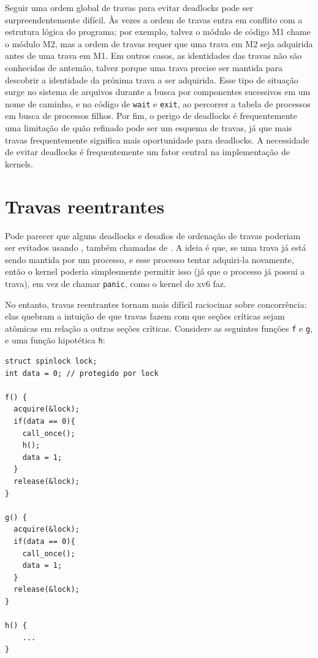 Seguir uma ordem global de travas para evitar deadlocks pode ser surpreendentemente
difícil. Às vezes a ordem de travas entra em conflito com a estrutura lógica do
programa; por exemplo, talvez o módulo de código M1 chame o módulo M2, mas a ordem
de travas requer que uma trava em M2 seja adquirida antes de uma trava em M1.
Em outros casos, as identidades das travas não são conhecidas de antemão, talvez
porque uma trava precise ser mantida para descobrir a identidade
da próxima trava a ser adquirida. Esse tipo de situação surge no
sistema de arquivos durante a busca por componentes sucessivos em um nome de caminho, e
no código de {\tt wait} e {\tt exit}, ao percorrer a tabela de
processos em busca de processos filhos. Por fim, o perigo de deadlocks
é frequentemente uma limitação de quão refinado pode ser um esquema de travas,
já que mais travas frequentemente significa mais oportunidade para deadlocks.
A necessidade de evitar deadlocks é frequentemente um fator central na
implementação de kernels.

\section{Travas reentrantes}

Pode parecer que alguns deadlocks e desafios de ordenação de travas poderiam
ser evitados usando , também chamadas de
. A ideia é que, se uma trava já está sendo mantida
por um processo, e esse processo tentar adquiri-la novamente,
então o kernel poderia simplesmente permitir isso (já que o processo já
possui a trava), em vez de chamar \texttt{panic}, como o kernel do xv6 faz.

No entanto, travas reentrantes tornam mais difícil raciocinar
sobre concorrência: elas quebram a intuição de que travas
fazem com que seções críticas sejam atômicas em relação a outras seções críticas.
Considere as seguintes funções \lstinline{f}
e \lstinline{g}, e uma função hipotética \lstinline{h}:

\begin{lstlisting}
struct spinlock lock;
int data = 0; // protegido por lock

f() {
  acquire(&lock);
  if(data == 0){
    call_once();
    h();
    data = 1;
  }
  release(&lock);
}

g() {
  acquire(&lock);
  if(data == 0){
    call_once();
    data = 1;
  }
  release(&lock);
}

h() {
    ...
}
\end{lstlisting}

